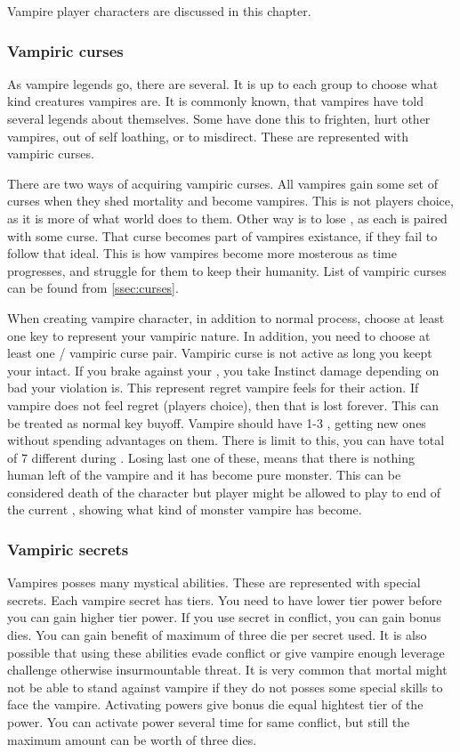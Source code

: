 Vampire player characters are discussed in this chapter.

\subsubsection{Vampiric curses}

As vampire legends go, there are several.
It is up to each group to choose what kind creatures vampires are.
It is commonly known, that vampires have told several legends about themselves.
Some have done this to frighten, hurt other vampires, out of self loathing, or to misdirect.
These are represented with vampiric curses.

There are two ways of acquiring vampiric curses.
All vampires gain some set of curses when they shed mortality and become vampires.
This is not players choice, as it is more of what world does to them.
Other way is to lose \humanity{}, as each \humanity{} is paired with some curse.
That curse becomes part of vampires existance, if they fail to follow that ideal.
This is how vampires become more mosterous as time progresses, and struggle for them to keep their humanity.
List of vampiric curses can be found from \ref{ssec:curses}.

When creating vampire character, in addition to normal process, choose at least one key to represent your vampiric nature.
In addition, you need to choose at least one \humanity{} / vampiric curse pair.
Vampiric curse is not active as long you keept your \humanity{} intact.
If you brake against your \humanity{}, you take Instinct damage depending on bad your violation is.
This represent regret vampire feels for their action.
If vampire does not feel regret (players choice), then that \humanity{} is lost forever.
This can be treated as normal key buyoff.
Vampire should have 1-3 \humanities{}, getting new ones without spending advantages on them.
There is limit to this, you can have total of 7 different \humanities{} during \campaign{}.
Losing last one of these, means that there is nothing human left of the vampire and it has become pure monster.
This can be considered death of the character but player might be allowed to play to end of the current \session{}, showing what kind of monster vampire has become.

\subsubsection{Vampiric secrets}
Vampires posses many mystical abilities.
These are represented with special secrets.
Each vampire secret has tiers.
You need to have lower tier power before you can gain higher tier power.
If you use secret in conflict, you can gain bonus dies.
You can gain benefit of maximum of three die per secret used.
It is also possible that using these abilities evade conflict or give vampire enough leverage challenge otherwise insurmountable threat.
It is very common that mortal might not be able to stand against vampire if they do not posses some special skills to face the vampire.
Activating powers give bonus die equal hightest tier of the power.
You can activate power several time for same conflict, but still the maximum amount can be worth of three dies.

